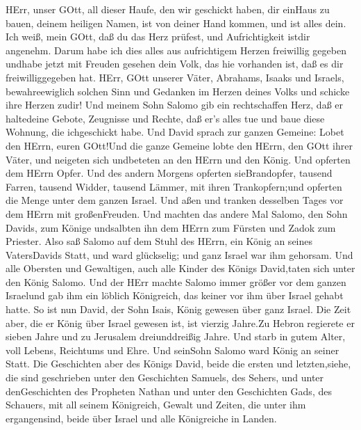  HErr, unser GOtt, all dieser Haufe, den wir geschickt
haben, dir einHaus zu bauen, deinem heiligen Namen, ist von deiner Hand
kommen, und ist alles dein.  Ich weiß, mein GOtt, daß du
das Herz prüfest, und Aufrichtigkeit istdir angenehm. Darum habe ich
dies alles aus aufrichtigem Herzen freiwillig gegeben undhabe jetzt mit
Freuden gesehen dein Volk, das hie vorhanden ist, daß es dir
freiwilliggegeben hat.  HErr, GOtt unserer Väter, Abrahams,
Isaaks und Israels, bewahreewiglich solchen Sinn und Gedanken im Herzen
deines Volks und schicke ihre Herzen zudir!  Und meinem
Sohn Salomo gib ein rechtschaffen Herz, daß er haltedeine Gebote,
Zeugnisse und Rechte, daß er's alles tue und baue diese Wohnung, die
ichgeschickt habe.  Und David sprach zur ganzen Gemeine:
Lobet den HErrn, euren GOtt!Und die ganze Gemeine lobte den HErrn, den
GOtt ihrer Väter, und neigeten sich undbeteten an den HErrn und den
König.  Und opferten dem HErrn Opfer. Und des andern
Morgens opferten sieBrandopfer, tausend Farren, tausend Widder, tausend
Lämmer, mit ihren Trankopfern;und opferten die Menge unter dem ganzen
Israel.  Und aßen und tranken desselben Tages vor dem HErrn
mit großenFreuden. Und machten das andere Mal Salomo, den Sohn Davids,
zum Könige undsalbten ihn dem HErrn zum Fürsten und Zadok zum Priester.
 Also saß Salomo auf dem Stuhl des HErrn, ein König an
seines VatersDavids Statt, und ward glückselig; und ganz Israel war ihm
gehorsam.  Und alle Obersten und Gewaltigen, auch alle
Kinder des Königs David,taten sich unter den König Salomo. 
Und der HErr machte Salomo immer größer vor dem ganzen Israelund gab ihm
ein löblich Königreich, das keiner vor ihm über Israel gehabt hatte.
 So ist nun David, der Sohn Isais, König gewesen über ganz
Israel.  Die Zeit aber, die er König über Israel gewesen
ist, ist vierzig Jahre.Zu Hebron regierete er sieben Jahre und zu
Jerusalem dreiunddreißig Jahre.  Und starb in gutem Alter,
voll Lebens, Reichtums und Ehre. Und seinSohn Salomo ward König an
seiner Statt.  Die Geschichten aber des Königs David, beide
die ersten und letzten,siehe, die sind geschrieben unter den Geschichten
Samuels, des Sehers, und unter denGeschichten des Propheten Nathan und
unter den Geschichten Gads, des Schauers,  mit all seinem
Königreich, Gewalt und Zeiten, die unter ihm ergangensind, beide über
Israel und alle Königreiche in Landen.
